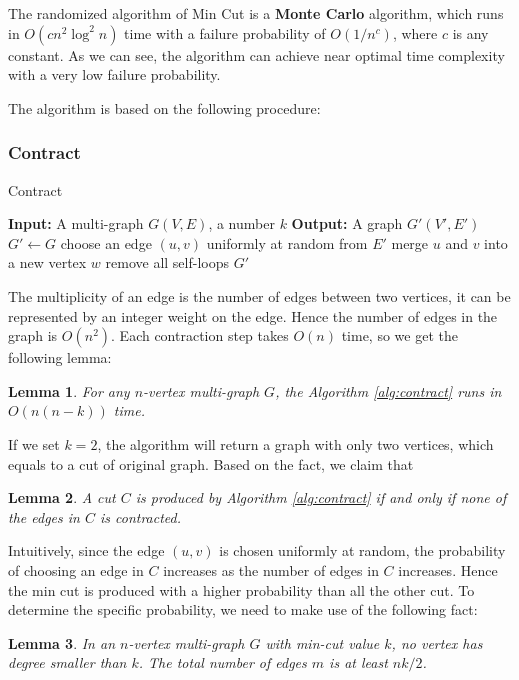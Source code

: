 \documentclass[11pt]{article}
\theoremstyle{plain}
\newtheorem{lemma}{Lemma}[section]
\begin{document}
The randomized algorithm of Min Cut is a \textbf{Monte Carlo} algorithm, which runs in $O(cn^2\log^2 n)$ time with a failure probability of $O(1/n^c)$, where $c$ is any constant. As we can see, the algorithm can achieve near optimal time complexity with a very low failure probability.

The algorithm is based on the following procedure:
\subsubsection{Contract}
\begin{algorithm}
\caption{Contract}
\label{alg:contract}
\begin{algorithmic}
    \STATE \textbf{Input:} A multi-graph $G(V,E)$, a number $k$
    \STATE \textbf{Output:} A graph $G'(V',E')$
    \STATE $G'\leftarrow G$
    \STATE choose an edge $(u,v)$ uniformly at random from $E'$
    \STATE merge $u$ and $v$ into a new vertex $w$
    \STATE remove all self-loops
    \ENDWHILE
    \RETURN $G'$
\end{algorithmic}
\end{algorithm}
The multiplicity of an edge is the number of edges between two vertices, it can be represented by an integer weight on the edge. Hence the number of edges in the graph is $O(n^2)$. Each contraction step takes $O(n)$ time, so we get the following lemma:

\begin{lemma}
    \label{lemma:9}
    For any $n$-vertex multi-graph $G$, the Algorithm \ref{alg:contract} runs in $O(n(n-k))$ time.
\end{lemma}

If we set $k=2$, the algorithm will return a graph with only two vertices, which equals to a cut of original graph. Based on the fact, we claim that

\begin{lemma}
    \label{lemma:cut}
    A cut $C$ is produced by Algorithm \ref{alg:contract} if and only if none of the edges in $C$ is contracted.
\end{lemma}

Intuitively, since the edge $(u,v)$ is chosen uniformly at random, the probability of choosing an edge in $C$ increases as the number of edges in $C$ increases. Hence the min cut is produced with a higher probability than all the other cut. To determine the specific probability, we need to make use of the following fact:

\begin{lemma}
    \label{lemma:degree}
    In an $n$-vertex multi-graph $G$ with min-cut value $k$, no vertex has degree smaller than $k$. The total number of edges $m$ is at least $nk/2$.
\end{lemma}
\end{document}
